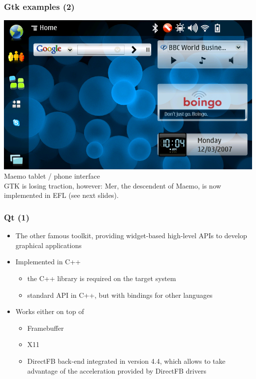 \begin{frame}
  \frametitle{Gtk examples (2)}
    \includegraphics[height=0.6\textheight]{slides/sysdev-embedded-linux/maemo-gui.png}\\
    Maemo tablet / phone interface\\
    GTK is losing traction, however:
    Mer, the descendent of Maemo, is now implemented in EFL (see next
    slides).\\
\end{frame}

\begin{frame}
  \frametitle{Qt (1)}
  \begin{itemize}
  \item The other famous toolkit, providing widget-based high-level APIs to
    develop graphical applications
  \item Implemented in C++
    \begin{itemize}
    \item the C++ library is required on the target system
    \item standard API in C++, but with bindings for other languages
    \end{itemize}
  \item Works either on top of
    \begin{itemize}
    \item Framebuffer
    \item X11
    \item DirectFB back-end integrated in version 4.4, which allows to take
      advantage of the acceleration provided by DirectFB drivers
    \end{itemize}
  \end{itemize}
\end{frame}


